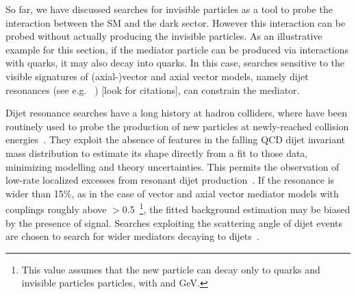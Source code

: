 


So far, we have discussed searches for invisible particles as a tool to probe the interaction between the SM and the dark sector. 
However this interaction can be probed without actually producing the invisible particles. As an illustrative example for this section, if the mediator particle can be produced via interactions with quarks, it may also decay into quarks. 
In this case, searches sensitive to the visible signatures of (axial-)vector and axial vector models, namely dijet resonances (see e.g. ~\cite{Liew:2016oon,Fairbairn:2016iuf,Chala:2015ama}) [look for citations], can constrain the mediator.

Dijet resonance searches have a long history at hadron colliders, where have been routinely used to probe the production of new particles at newly-reached collision energies~\cite{Harris:2011bh}. 
They exploit the absence of features in the falling QCD dijet invariant mass distribution to estimate its shape directly from a fit to those data, minimizing modelling and theory uncertainties. This permits the observation of low-rate localized excesses from resonant dijet production~\cite{Aaboud:2017yvp,CMS-PAS-EXO-16-056}. If the resonance is wider than 15\%, as in the case of 
vector and axial vector mediator models with couplings roughly above \gq$>$0.5~\footnote{This value
assumes that the new particle can decay only to quarks and invisible particles particles, with  and  GeV.}, the fitted background estimation may be biased by the presence of signal. Searches exploiting 
the scattering angle of dijet events are chosen to search for wider mediators decaying to dijets~\cite{CMS-PAS-EXO-16-046,Aaboud:2017yvp}. 

